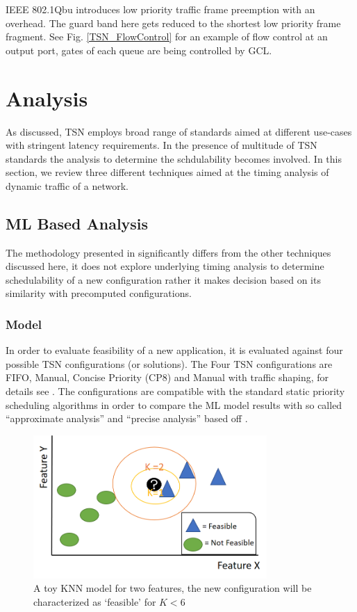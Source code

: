 \documentclass[journal,12pt,twocolumn]{IEEEtran}
\begin{document}
IEEE 802.1Qbu \cite{IEEE802.1Qbu} introduces low priority traffic frame preemption with an overhead. The guard band here gets reduced to the shortest low priority frame fragment. See Fig. \ref{TSN_FlowControl} for an example of flow control at an output port, gates of each queue are being controlled by GCL.

\section {Analysis}
As discussed, TSN employs broad range of standards aimed at different use-cases with stringent latency requirements. In the presence of multitude of TSN standards the analysis to determine the schdulability becomes involved. In this section, we review three different techniques aimed at the timing analysis of dynamic traffic of a network.

\subsection {ML Based Analysis}
The methodology presented in \cite{ML} significantly differs from the other techniques discussed here, it does not explore underlying timing analysis to determine schedulability of a new configuration rather it makes decision based on its similarity with precomputed configurations.

\subsubsection{Model}
In order to evaluate feasibility of a new application, it is evaluated against four possible TSN configurations (or solutions). The Four TSN configurations are FIFO, Manual, Concise Priority (CP8) and Manual with traffic shaping, for details see \cite{ML}. The configurations are compatible with the standard static priority scheduling algorithms in order to compare the ML model results with so called “approximate analysis” and “precise analysis'' based off  \cite{8,9,37}.
\begin{figure}
\centering
\includegraphics[width=3.5in]{KNN}
\caption{A toy KNN model for two features, the new configuration will be characterized as `feasible' for $K<6$}
\label{KNN}
\end{figure}
\end{document}
